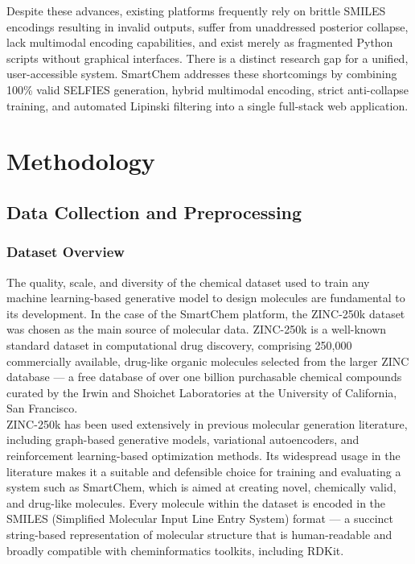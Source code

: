 \documentclass[12pt,a4paper]{report}
\begin{document}
Despite these advances, existing platforms frequently rely on brittle SMILES encodings resulting in invalid outputs, suffer from unaddressed posterior collapse, lack multimodal encoding capabilities, and exist merely as fragmented Python scripts without graphical interfaces. There is a distinct research gap for a unified, user-accessible system. SmartChem addresses these shortcomings by combining 100\% valid SELFIES generation, hybrid multimodal encoding, strict anti-collapse training, and automated Lipinski filtering into a single full-stack web application.

\chapter{Methodology}

\section{Data Collection and Preprocessing}

\subsection{Dataset Overview}

The quality, scale, and diversity of the chemical dataset used to train any machine learning-based generative model to design molecules are fundamental to its development. In the case of the SmartChem platform, the ZINC-250k dataset was chosen as the main source of molecular data. ZINC-250k is a well-known standard dataset in computational drug discovery, comprising 250,000 commercially available, drug-like organic molecules selected from the larger ZINC database — a free database of over one billion purchasable chemical compounds curated by the Irwin and Shoichet Laboratories at the University of California, San Francisco.\\

ZINC-250k has been used extensively in previous molecular generation literature, including graph-based generative models, variational autoencoders, and reinforcement learning-based optimization methods. Its widespread usage in the literature makes it a suitable and defensible choice for training and evaluating a system such as SmartChem, which is aimed at creating novel, chemically valid, and drug-like molecules. Every molecule within the dataset is encoded in the SMILES (Simplified Molecular Input Line Entry System) format — a succinct string-based representation of molecular structure that is human-readable and broadly compatible with cheminformatics toolkits, including RDKit.
\end{document}
